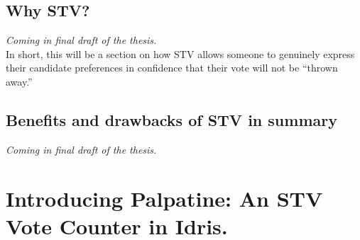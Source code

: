 \section{Why STV?}
\textit{Coming in final draft of the thesis.} \\
In short, this will be a section on how STV allows someone to genuinely express
their candidate preferences in confidence that their vote will not be ``thrown
away.''

\section{Benefits and drawbacks of STV in summary}
\textit{Coming in final draft of the thesis.}



\chapter{Introducing Palpatine: An STV Vote Counter in Idris.}

